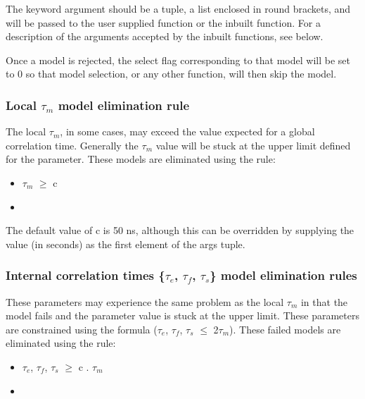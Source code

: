  The  keyword argument should be a tuple, a list enclosed in round brackets, and will be passed to the user supplied function or the inbuilt function.  For a description of the arguments accepted by the inbuilt functions, see below. 
  

 Once a model is rejected, the select flag corresponding to that model will be set to 0 so that model selection, or any other function, will then skip the model. 
  

  
 \subsubsection{Local $\tau_m$ model elimination rule} 

 The local $\tau_m$, in some cases, may exceed the value expected for a global correlation time. Generally the $\tau_m$ value will be stuck at the upper limit defined for the parameter.  These models are eliminated using the rule: 
  

 \begin{itemize} 
 \item[] $\tau_m$ $\ge$ c  
 \item[]  
 \end{itemize} 
  

 The default value of c is 50 ns, although this can be overridden by supplying the value (in seconds) as the first element of the args tuple. 
  

  
 \subsubsection{Internal correlation times \{$\tau_e$, $\tau_f$, $\tau_s$\} model elimination rules} 

 These parameters may experience the same problem as the local $\tau_m$ in that the model fails and the parameter value is stuck at the upper limit.  These parameters are constrained using the formula ($\tau_e$, $\tau_f$, $\tau_s$ $\le$ 2$\tau_m$).  These failed models are eliminated using the rule: 
  

 \begin{itemize} 
 \item[] $\tau_e$, $\tau_f$, $\tau_s$ $\ge$ c . $\tau_m$  
 \item[]  
 \end{itemize} 
  

